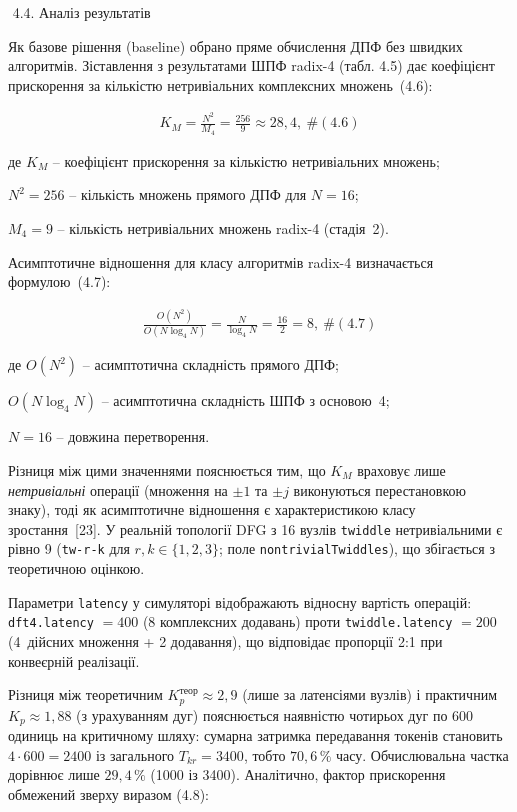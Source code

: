 \documentclass[
]{article}
\newcommand{\passthrough}[1]{#1}
\begin{document}
\(\)\(\)\(\)
\protect{}\label{Xeca429076ae93597dc7393f715a486506130431}{}4.4.
Аналіз результатів

Як базове рішення (baseline) обрано пряме обчислення ДПФ без швидких
алгоритмів. Зіставлення з результатами ШПФ radix-4 (табл. 4.5) дає
коефіцієнт прискорення за кількістю нетривіальних комплексних
множень~(4.6):

\[\begin{array}{r}
K_{M} = \frac{N^{2}}{M_{4}} = \frac{256}{9} \approx 28,4,\ \#(4.6)
\end{array}\]

де \(K_{M}\) -- коефіцієнт прискорення за кількістю нетривіальних
множень;

\(N^{2} = 256\) -- кількість множень прямого ДПФ для \(N = 16\);

\(M_{4} = 9\) -- кількість нетривіальних множень radix-4 (стадія~2).

Асимптотичне відношення для класу алгоритмів radix-4 визначається
формулою~(4.7):

\[\begin{array}{r}
\frac{O\left( N^{2} \right)}{O\left( N\log_{4}N \right)} = \frac{N}{\log_{4}N} = \frac{16}{2} = 8,\ \#(4.7)
\end{array}\]

де \(O(N^{2})\) -- асимптотична складність прямого ДПФ;

\(O(N\log_{4}N)\) -- асимптотична складність ШПФ з основою~4;

\(N = 16\) -- довжина перетворення.

Різниця між цими значеннями пояснюється тим, що \(K_{M}\) враховує лише
\emph{нетривіальні} операції (множення на \(\pm 1\) та \(\pm j\)
виконуються перестановкою знаку), тоді як асимптотичне відношення є
характеристикою класу зростання~{[}23{]}. У реальній топології DFG з 16
вузлів \passthrough{\lstinline!twiddle!} нетривіальними є рівно 9
(\passthrough{\lstinline!tw!}\passthrough{\lstinline!-r-k!} для
\(r,k \in \{ 1,2,3\}\); поле
\passthrough{\lstinline!nontrivialTwiddles!}), що збігається з
теоретичною оцінкою.

Параметри \passthrough{\lstinline!latency!} у симуляторі відображають
відносну вартість операцій: \passthrough{\lstinline!dft4.latency!}
\(= 400\) (8 комплексних додавань) проти
\passthrough{\lstinline!twiddle.latency!} \(= 200\) (4~дійсних множення
+ 2 додавання), що відповідає пропорції 2:1 при конвеєрній реалізації.

Різниця між теоретичним \(K_{p}^{\text{теор}} \approx 2,9\) (лише за
латенсіями вузлів) і практичним \(K_{p} \approx 1,88\) (з урахуванням
дуг) пояснюється наявністю чотирьох дуг по 600 одиниць на критичному
шляху: сумарна затримка передавання токенів становить
\(4 \cdot 600 = 2400\) із загального \(T_{kr} = 3400\), тобто
\(70,6\,\%\) часу. Обчислювальна частка дорівнює лише \(29,4\,\%\) (1000
із 3400). Аналітично, фактор прискорення обмежений зверху виразом (4.8):
\end{document}
